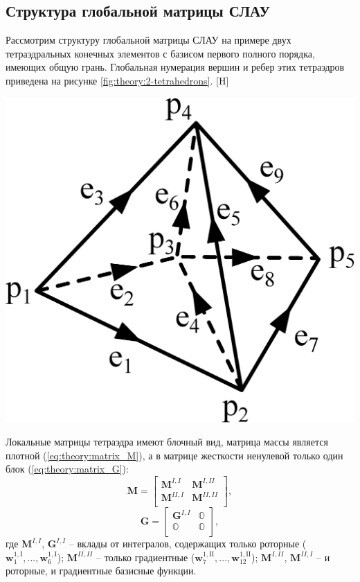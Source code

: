 \documentclass[a4paper,14pt]{article}
\makeatletter
\renewenvironment{figure}[1][\fps@figure]{
  \edef\@tempa{\noexpand\@float{figure}[#1]}
  \@tempa
  \addtocounter{foofigure}{1}
}{
  \end@float
}
\makeatother
\begin{document}
\subsection{Структура глобальной матрицы СЛАУ}
Рассмотрим структуру глобальной матрицы СЛАУ на примере двух тетраэдральных конечных элементов с базисом первого полного порядка, имеющих общую грань. Глобальная нумерация вершин и ребер этих тетраэдров приведена на рисунке \ref{fig:theory:2-tetrahedrons}.
\begin{figure}[H]
	\centering
	\includegraphics[scale=0.25]{theory/2-tetrahedrons.eps}
	\caption{два тетраэдральных конечных элемента}
	\label{fig:theory:2-tetrahedrons}
\end{figure}

Локальные матрицы тетраэдра имеют блочный вид, матрица массы является плотной (\ref{eq:theory:matrix_M}), а в матрице жесткости ненулевой только один блок (\ref{eq:theory:matrix_G}):
\begin{equation}
	\mathbf{M} = \left[
	\begin{matrix}
		\mathbf{M}^{I, I} & \mathbf{M}^{I, II} \\
		\mathbf{M}^{II, I} & \mathbf{M}^{II, II} \\
	\end{matrix}
	\right] , \label{eq:theory:matrix_M}
\end{equation}
\begin{equation}
	\mathbf{G} = \left[
	\begin{matrix}
		\mathbf{G}^{I, I} & \mathbb{O} \\
		\mathbb{O} &  \mathbb{O} \\
	\end{matrix}
	\right] , \label{eq:theory:matrix_G}
\end{equation}
где $\mathbf{M}^{I, I}$, $\mathbf{G}^{I, I}$ -- вклады от интегралов, содержащих только роторные ($\mathbf{w}_{1}^{1,\mathrm{I}}, ..., \mathbf{w}_{6}^{1,\mathrm{I}}$); $\mathbf{M}^{II, II}$ -- только градиентные ($\mathbf{w}_{7}^{1,\mathrm{II}}, ..., \mathbf{w}_{12}^{1,\mathrm{II}}$); $\mathbf{M}^{I, II}$, $\mathbf{M}^{II, I}$ -- и роторные, и градиентные базисные функции.
\end{document}
